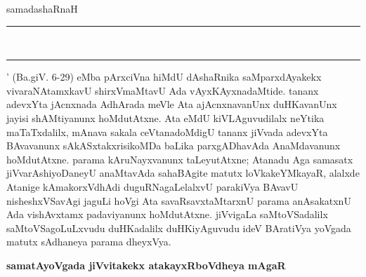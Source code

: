 samadashaRnaH {\rm \rule{.029cm}{.2cm}}~{\rm \rule{.029cm}{.2cm}} ' (Ba.giV. {\rm 6-29}) eMba pArxciVna hiMdU dAshaRnika saMparxdAyakekx vivaraNAtamxkavU shirxVmaMtavU Ada vAyxKAyxnadaMtide. tananx adevxYta jAcnxnada AdhArada meVle Ata ajAcnxnavanUnx duHKavanUnx jayisi shAMti\-yanunx hoMdutAtxne. Ata eMdU kiVLAguvudilalx neYtika maTaTxdalilx, mAnava sakala ceVtanadoMdigU tananx jiVvada adevxYta BAvavanunx sAkASxtakxrisikoMDa baLika parxgADha\-vAda AnaMdavanunx hoMdu\-tAtxne. parama kAruNayxvanunx taLeyutAtxne; Atanadu Aga samasatx jiVvarAshiyoDaneyU anaMtavAda sahaBAgite matutx loVkakeYMkayaR, alalxde Atanige kAmakorxVdhAdi duguRNagaLelalxvU parakiVya BAvavU nisheshxVSavAgi jaguLi hoVgi Ata savaRsavxtaMtarxnU parama anAsakatxnU Ada vishAvxtamx padaviyanunx hoMdu\-tAtxne. jiVvigaLa saMtoVSadalilx saMtoVSagoLuLxvudu duHKadalilx duHKiyAguvudu ideV BAratiVya yoVgada matutx sAdhaneya parama dheyxVya.

\bigskip
\begin{center}
{\Large\bf samatAyoVgada jiVvitakekx atakayxRboVdheya mAgaR}
\end{center}

